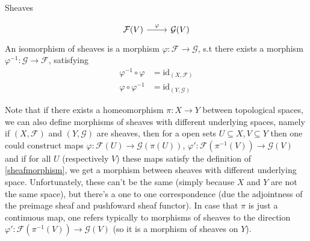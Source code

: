 \begin{section}{Sheaves}
\begin{definition}
\[\begin{tikzcd}
            \mathcal{F}(V) \arrow[r, "\varphi"] & \mathcal{G}(V)
        \end{tikzcd}
    \]
    An isomorphism of sheaves is a morphism \( \varphi : \mathcal{F} \to \mathcal{G} \), s.t there exists a morphism 
    \( \varphi^{-1} : \mathcal{G} \to \mathcal{F} \), satisfying 
    \begin{align*}
        \varphi^{-1} \circ \varphi &= \text{id}_{(X, \mathcal{F})} \\
    \varphi \circ \varphi^{-1} &= \text{id}_{(Y, \mathcal{G})} 
    \end{align*}
\end{definition}
Note that if there exists a homeomorphism \( \pi : X \to Y \) between topological spaces, we can
also define morphisms of sheaves with different underlying spaces, namely if \( (X, \mathcal{F}) \) and \( (Y, \mathcal{G}) \)
are sheaves, then for a open sets \( U \subseteq X, V \subseteq Y \) then one could construct maps 
\( \varphi : \mathcal{F}(U) \to \mathcal{G}(\pi(U)) \), \( \varphi' : \mathcal{F}(\pi^{-1}(V)) \to \mathcal{G}(V)  \)
and if for all \( U \) (respectively \( V \)) these maps satisfy the definition of \ref{sheafmorphism},
we get a morphism between sheaves with different underlying space. Unfortunately, these can't be the same
(simply because \( X \) and \( Y \) are not the same space), but there's a one to one correspondence
(due the adjointness of the preimage sheaf and pushfoward sheaf functor). In case that \( \pi \)
is just a continuous map, one refers typically to morphisms of sheaves to the direction \( \varphi' : \mathcal{F}(\pi^{-1}(V)) \to \mathcal{G}(V) \) 
(so it is a morphism of sheaves on \( Y \)).


\end{section}
